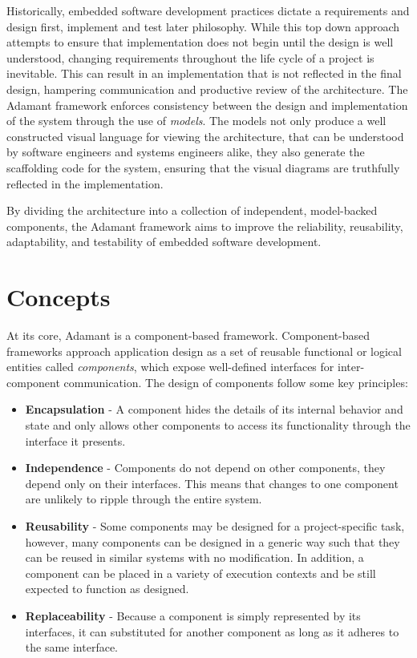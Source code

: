 Historically, embedded software development practices dictate a requirements and design first, implement and test later philosophy. While this top down approach attempts to ensure that implementation does not begin until the design is well understood, changing requirements throughout the life cycle of a project is inevitable. This can result in an implementation that is not reflected in the final design, hampering communication and productive review of the architecture. The Adamant framework enforces consistency between the design and implementation of the system through the use of \textit{models}. The models not only produce a well constructed visual language for viewing the architecture, that can be understood by software engineers and systems engineers alike, they also generate the scaffolding code for the system, ensuring that the visual diagrams are truthfully reflected in the implementation.  

By dividing the architecture into a collection of independent, model-backed components, the Adamant framework aims to improve the reliability, reusability, adaptability, and testability of embedded software development.

\section{Concepts}

At its core, Adamant is a component-based framework. Component-based frameworks approach application design as a set of reusable functional or logical entities called \textit{components}, which expose well-defined interfaces for inter-component communication. The design of components follow some key principles:

\begin{itemize}
  \item \textbf{Encapsulation} - A component hides the details of its internal behavior and state and only allows other components to access its functionality through the interface it presents. 
  \item \textbf{Independence} - Components do not depend on other components, they depend only on their interfaces. This means that changes to one component are unlikely to ripple through the entire system. 
  \item \textbf{Reusability} - Some components may be designed for a project-specific task, however, many components can be designed in a generic way such that they can be reused in similar systems with no modification. In addition, a component can be placed in a variety of execution contexts and be still expected to function as designed.
  \item \textbf{Replaceability} - Because a component is simply represented by its interfaces, it can substituted for another component as long as it adheres to the same interface. 
\end{itemize}

